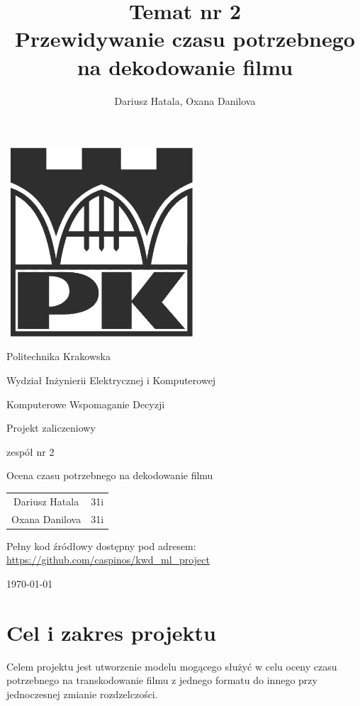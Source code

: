 \documentclass[11pt, a4paper]{article}
\title{
    Temat nr 2 \\
    \textbf{Przewidywanie czasu potrzebnego na dekodowanie filmu} \\
}
\author{Dariusz Hatala, Oxana Danilova}
\begin{document}
\begin{titlepage}
	\centering
	\includegraphics[width=200pt,height=200pt]{graphics/znak_pk.png}
	\vspace{1cm} \par
	\Large{Politechnika Krakowska} \\
	\vspace{0.2cm} \par
	\Large{Wydział Inżynierii Elektrycznej i Komputerowej}
	\vspace{0.7cm} \par
	\Large{
	    Komputerowe Wspomaganie Decyzji
    }
	\vspace{0.7cm} \par
	\Large{
	    Projekt zaliczeniowy \par
	    zespół nr 2
    }
	\vspace{0.5cm} \par
	\Huge{Ocena czasu potrzebnego na dekodowanie filmu}
	\vspace{1cm} \par
	\Large{
    	\begin{tabular}{c c}
    	    Dariusz Hatala & 31i \\
    	    Oxana Danilova & 31i \\
    	\end{tabular}
	}
    
    \vfill
    
    Pełny kod źródłowy dostępny pod adresem: \url{https://github.com/caspinos/kwd\_ml\_project}
	
	\vfill

	{\large \today\par}
\end{titlepage}

\tableofcontents
\newpage

\section{Cel i zakres projektu}
    Celem projektu jest utworzenie modelu mogącego służyć w celu oceny czasu potrzebnego na transkodowanie filmu z jednego formatu do innego przy jednoczesnej zmianie rozdzelczości.
\end{document}
